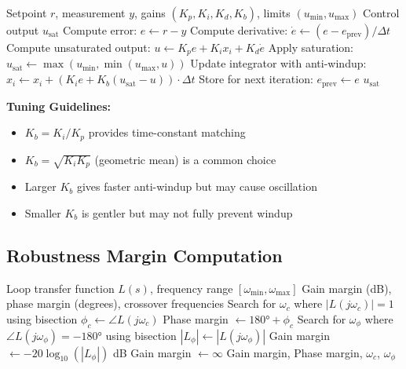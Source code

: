 \begin{algorithm}[H]
\caption{PID with Back-Calculation Anti-Windup}
\label{alg:antiwindup}
\begin{algorithmic}[1]
\REQUIRE Setpoint $r$, measurement $y$, gains $(K_p, K_i, K_d, K_b)$, limits $(u_{\min}, u_{\max})$
\ENSURE Control output $u_{\text{sat}}$
\STATE Compute error: $e \gets r - y$
\STATE Compute derivative: $\dot{e} \gets (e - e_{\text{prev}}) / \Delta t$
\STATE Compute unsaturated output: $u \gets K_p e + K_i x_i + K_d \dot{e}$
\STATE Apply saturation: $u_{\text{sat}} \gets \max(u_{\min}, \min(u_{\max}, u))$
\STATE Update integrator with anti-windup:
\STATE \quad $x_i \gets x_i + (K_i e + K_b (u_{\text{sat}} - u)) \cdot \Delta t$
\STATE Store for next iteration: $e_{\text{prev}} \gets e$
\RETURN $u_{\text{sat}}$
\end{algorithmic}
\end{algorithm}

\textbf{Tuning Guidelines:}
\begin{itemize}
    \item $K_b = K_i / K_p$ provides time-constant matching
    \item $K_b = \sqrt{K_i K_p}$ (geometric mean) is a common choice
    \item Larger $K_b$ gives faster anti-windup but may cause oscillation
    \item Smaller $K_b$ is gentler but may not fully prevent windup
\end{itemize}

\subsection{Robustness Margin Computation}

\begin{algorithm}[H]
\caption{Gain and Phase Margin Calculation}
\label{alg:margins}
\begin{algorithmic}[1]
\REQUIRE Loop transfer function $L(s)$, frequency range $[\omega_{\min}, \omega_{\max}]$
\ENSURE Gain margin (dB), phase margin (degrees), crossover frequencies
\STATE {}
\STATE Search for $\omega_c$ where $|L(j\omega_c)| = 1$ using bisection
\STATE $\phi_c \gets \angle L(j\omega_c)$
\STATE Phase margin $\gets 180° + \phi_c$
\STATE
\STATE {}
\STATE Search for $\omega_{\phi}$ where $\angle L(j\omega_{\phi}) = -180°$ using bisection
    \STATE $|L_{\phi}| \gets |L(j\omega_{\phi})|$
    \STATE Gain margin $\gets -20 \log_{10}(|L_{\phi}|)$ dB
\ELSE
    \STATE Gain margin $\gets \infty$
\ENDIF
\RETURN Gain margin, Phase margin, $\omega_c$, $\omega_{\phi}$
\end{algorithmic}
\end{algorithm}

